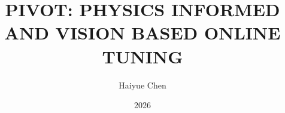 \documentclass[12pt]{report}
\title{PIVOT: PHYSICS INFORMED AND VISION BASED ONLINE TUNING}
\author{Haiyue Chen}
\date{2026}
\begin{document}
\maketitle
\setcounter{page}{2}


\makeacknowledgement

\makeabstract

\tableofcontents

\clearpage {} {} \begin{singlespacing} \listoftables \end{singlespacing}


\begin{mainf}















\end{mainf}

\begin{bibliof}

\end{bibliof}
\end{document}
